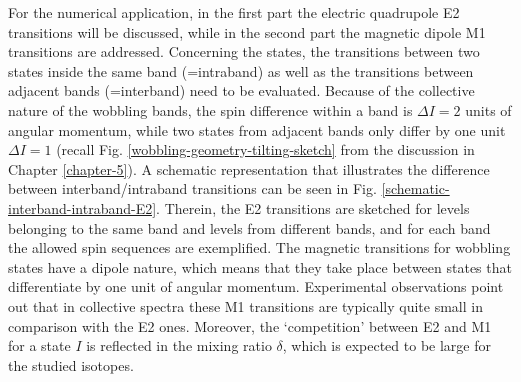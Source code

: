 For the numerical application, in the first part the electric quadrupole E2 transitions will be discussed, while in the second part the magnetic dipole M1 transitions are addressed. Concerning the states, the transitions between two states inside the same band (=intraband) as well as the transitions between adjacent bands (=interband) need to be evaluated. Because of the collective nature of the wobbling bands, the spin difference within a band is $\Delta I=2$ units of angular momentum, while two states from adjacent bands only differ by one unit $\Delta I=1$ (recall Fig. \ref{wobbling-geometry-tilting-sketch} from the discussion in Chapter \ref{chapter-5}). A schematic representation that illustrates the difference between interband/intraband transitions can be seen in Fig. \ref{schematic-interband-intraband-E2}. Therein, the E2 transitions are sketched for levels belonging to the same band and levels from different bands, and for each band the allowed spin sequences are exemplified. The magnetic transitions for wobbling states have a dipole nature, which means that they take place between states that differentiate by one unit of angular momentum. Experimental observations point out that in collective spectra these M1 transitions are typically quite small in comparison with the E2 ones. Moreover, the `competition' between E2 and M1 for a state $I$ is reflected in the mixing ratio $\delta$, which is expected to be large for the studied isotopes. 
